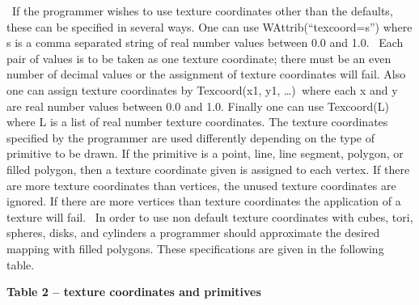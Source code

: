 \documentclass[letterpaper]{article}
\begin{document}
{
\ If the programmer wishes to use texture coordinates other than the defaults, these can be specified in several ways.
One can use \textsf{WAttrib(``texcoord=s'')} where \textsf{s} is a comma separated string of real number values between
\textsf{0.0} and \textsf{1.0}. \ Each pair of values is to be taken as one texture coordinate; there must be an even
number of decimal values or the assignment of texture coordinates will fail. Also one can assign texture coordinates by
\textsf{Texcoord(x1, y1, {\dots})}\texttt{ }where each \textsf{x} and \textsf{y} are real number values between
\textsf{0.0} and \textsf{1.0}. Finally one can use \textsf{Texcoord(L)} where \textsf{L} is a list of real number
texture coordinates. The texture coordinates specified by the programmer are used differently depending on the type of
primitive to be drawn. If the primitive is a point, line, line segment, polygon, or filled polygon, then a texture
coordinate given is assigned to each vertex. If there are more texture coordinates than vertices, the unused texture
coordinates are ignored. If there are more vertices than texture coordinates the application of a texture will fail.
\ In order to use non default texture coordinates with cubes, tori, spheres, disks, and cylinders a programmer should
approximate the desired mapping with filled polygons. These specifications are given in the following table. }


\bigskip

{\centering{}\bfseries
Table 2 -- texture coordinates and primitives
\par}


\bigskip
\end{document}

